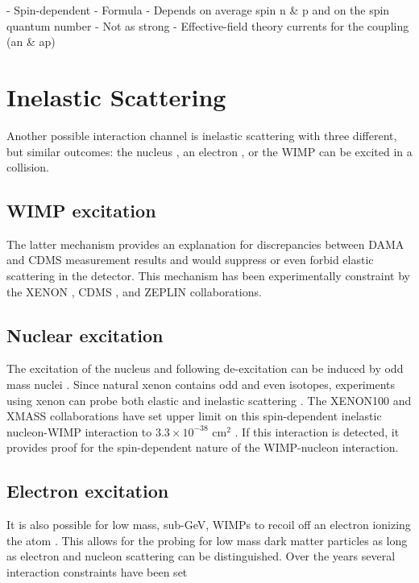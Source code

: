 \documentclass{article}
\begin{document}
- Spin-dependent
    - Formula
    - Depends on average spin n \& p and on the spin quantum number
    - Not as strong
    - Effective-field theory currents for the coupling (an \& ap)


\FloatBarrier
\section{Inelastic Scattering}

Another possible interaction channel is inelastic scattering with three different, but similar outcomes: the nucleus \cite{Ellis:1988nb}, an electron \cite{Starkman:1994gf}, or the WIMP \cite{TuckerSmith:2001hy, TuckerSmith:2004jv, Miao:2013sqa} can be excited in a collision. 




\subsection{WIMP excitation}

The latter mechanism provides an explanation for discrepancies between DAMA \cite{Finkbeiner:2009ug} and CDMS \cite{Ahmed:2008eu} measurement results \cite{Chang:2008gd} and would suppress or even forbid elastic scattering in the detector. This mechanism has been experimentally constraint by the XENON \cite{Aprile:2011ts}, CDMS \cite{Arrenberg:2011zz}, and ZEPLIN \cite{Akimov:2010vk} collaborations. 

\subsection{Nuclear excitation}

The excitation of the nucleus and following de-excitation can be induced by odd mass nuclei \cite{Baudis:2013bba}. Since natural xenon contains odd and even isotopes, experiments using xenon can probe both elastic and inelastic scattering \cite{McCabe:2015eia}. The XENON100 and XMASS collaborations have set upper limit on this spin-dependent inelastic nucleon-WIMP interaction to $3.3 \times 10^{-38}$ cm$^2$ \cite{Uchida:2014cnn, Aprile:2017ngb}. If this interaction is detected, it provides proof for the spin-dependent nature of the WIMP-nucleon interaction. 

\subsection{Electron excitation}

It is also possible for low mass, sub-GeV, WIMPs to recoil off an electron ionizing the atom \cite{Essig:2011nj}. This allows for the probing for low mass dark matter particles as long as electron and nucleon scattering can be distinguished. Over the years several interaction constraints have been set \cite{Essig:2012yx,Essig:2017kqs, Agnes:2018oej,Agnese:2018col,  Crisler:2018gci}
\end{document}
